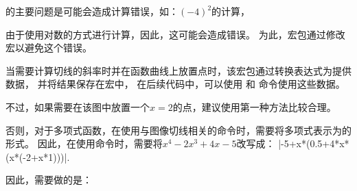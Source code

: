 \documentclass[../main.tex]{subfiles}
\begin{document}
的主要问题是可能会造成计算错误，如：$(-4)^2$的计算，

\begin{tkzltxexample}[]
\end{tkzltxexample}

由于使用对数的方式进行计算，因此，这可能会造成错误。
为此，宏包通过修改宏以避免这个错误。

当需要计算切线的斜率时并在函数曲线上放置点时，该宏包通过转换表达式为提供数据，
并将结果保存在宏中，
在后续代码中，可以使用 和 命令使用这些数据。

不过，如果需要在该图中放置一个$x=2$的点，建议使用第一种方法比较合理。

否则，对于多项式函数，在使用与图像切线相关的命令时，需要将多项式表示为的形式。
因此，在使用命令时，需要将$x^4-2x^3+4x-5$改写成：
|-5+x*(0.5+4*x*(x*(-2+x*1)))|.\

因此，需要做的是：

\begin{center}
\begin{tkzexample}[]
\end{tkzexample}
\end{center}
\end{document}
